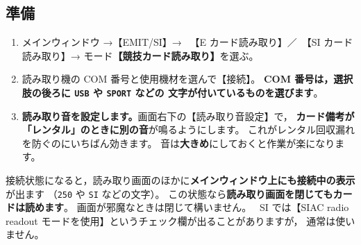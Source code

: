\subsection*{準備}

\begin{enumerate}
\item メインウィンドウ →【EMIT/SI】→
      \tEMIT\ 【E カード読み取り】／\tSI\ 【SI カード読み取り】→
      モード\textbf{【競技カード読み取り】}を選ぶ。\ver
\item 読み取り機の COM 番号と使用機材を選んで【接続】。
      \textbf{COM 番号は，選択肢の後ろに \texttt{USB} や \texttt{SPORT} などの
      文字が付いているものを選びます}。
\item \textbf{読み取り音を設定します。}画面右下の【読み取り音設定】で，
      \textbf{カード備考が「レンタル」のときに別の音}が鳴るようにします。
      これがレンタル回収漏れを防ぐのにいちばん効きます。
      音は\textbf{大きめ}にしておくと作業が楽になります。
\end{enumerate}

\begin{Note}[接続できたことの確認]
接続状態になると，読み取り画面のほかに\textbf{メインウィンドウ上にも接続中の表示}が出ます
（\texttt{250} や \texttt{SI} などの文字）。
この状態なら\textbf{読み取り画面を閉じてもカードは読めます}。
画面が邪魔なときは閉じて構いません。
\tSIAC\ SI では【SIAC radio readout モードを使用】というチェック欄が出ることがありますが，
通常は使いません。
\end{Note}

